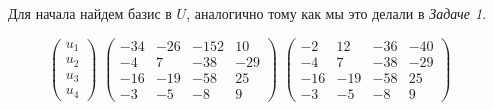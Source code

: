 \documentclass[10pt]{article}
\begin{document}
 \\ \\
 Для начала найдем базис в $U$, аналогично тому как мы это делали в \textit{Задаче 1}.
\begin{figure}[H] 
\raggedright
$\begin{pmatrix}
u_1 \\
u_2 \\
u_3 \\
u_4
\end{pmatrix}$
\text{ = }
$\begin{pmatrix}
	-34 & -26 & -152 & 10 \\
	-4 & 7 & -38 & -29  \\
	-16 & -19 & -58 & 25 \\
	-3 & -5 & -8 & 9
\end{pmatrix}$
\text{ = }
$\begin{pmatrix}
	-2 & 12 & -36 & -40 \\
	-4 & 7 & -38 & -29  \\
	-16 & -19 & -58 & 25 \\
	-3 & -5 & -8 & 9
\end{pmatrix}$
\text{ = }
\end{figure}
\end{document}

